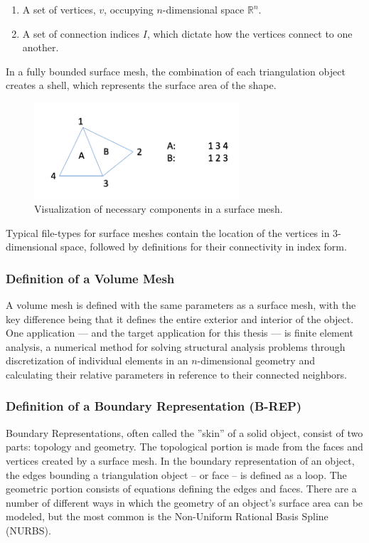 \documentclass[12pt]{drexelthesis}
\let\Oldsubsubsection\subsubsection
\renewcommand{\subsubsection}{\FloatBarrier\Oldsubsubsection}
\begin{document}
\begin{enumerate}
	\item A set of vertices, $v$, occupying $n$-dimensional space $\mathbb{R}^{n}$.
	\item A set of connection indices $I$, which dictate how the vertices connect to one another.
\end{enumerate}

In a fully bounded surface mesh, the combination of each triangulation object creates a shell, which represents the surface area of the shape.

\begin{figure}[!ht]
	\centering
	\includegraphics[width=3in]{points2surface/surface_mesh.png}
	\caption[Simple example of surface mesh components]{Visualization of necessary components in a surface mesh.}
	\label{meshing:surface_mesh}
\end{figure}

Typical file-types for surface meshes contain the location of the vertices in 3-dimensional space, followed by definitions for their connectivity in index form.

\subsubsection{Definition of a Volume Mesh}
A volume mesh is defined with the same parameters as a surface mesh, with the key difference being that it defines the entire exterior and interior of the object.
One application --- and the target application for this thesis --- is finite element analysis, a numerical method for solving structural analysis problems through discretization of individual elements in an $n$-dimensional geometry and calculating their relative parameters in reference to their connected neighbors.

\subsubsection{Definition of a Boundary Representation (B-REP)}
Boundary Representations, often called the ''skin'' of a solid object, consist of two parts: topology and geometry. The topological portion is made from the faces and vertices created by a surface mesh. In the boundary representation of an object, the edges bounding a triangulation object -- or face -- is defined as a loop. The geometric portion consists of equations defining the edges and faces. There are a number of different ways in which the geometry of an object's surface area can be modeled, but the most common is the Non-Uniform Rational Basis Spline (NURBS).
\end{document}
